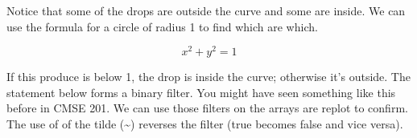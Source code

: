 Notice that some of the drops are outside the curve and some are inside.
We can use the formula for a circle of radius 1 to find which are which.

\[x^2 + y^2 = 1\]

If this produce is below 1, the drop is inside the curve; otherwise it's
outside. The statement below forms a binary filter. You might have seen
something like this before in CMSE 201. We can use those filters on the
arrays are replot to confirm. The use of of the tilde (\textasciitilde)
reverses the filter (true becomes false and vice versa).

\begin{Shaded}
\begin{Highlighting}[]
\OperatorTok{=}\NormalTok{ drops[:,}\NormalTok{]}\OperatorTok{**}\OperatorTok{+}\NormalTok{drops[:,}\NormalTok{]}\OperatorTok{**} \OperatorTok{\textless{}} 

\OperatorTok{=}\NormalTok{(}\NormalTok{,}\NormalTok{))}

\OperatorTok{=}\NormalTok{)}

\NormalTok{plt.scatter(drops[insideCurve,}\NormalTok{],drops[insideCurve,}\NormalTok{], c}\OperatorTok{=}\OperatorTok{=}\NormalTok{)}
\NormalTok{plt.scatter(drops[}\OperatorTok{\textasciitilde{}}\NormalTok{],drops[}\OperatorTok{\textasciitilde{}}\NormalTok{], c}\OperatorTok{=}\OperatorTok{=}\NormalTok{)}

\NormalTok{plt.axis([}\NormalTok{, }\NormalTok{, }\NormalTok{, }\NormalTok{])}
\end{Highlighting}
\end{Shaded}

